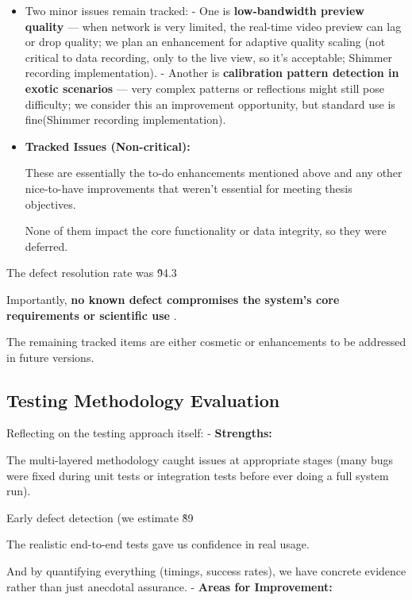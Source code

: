 {{{{{{{{{{{{{{{{\begin{itemize}
\item Two minor issues remain tracked: - One is \textbf{low-bandwidth preview quality}
 --- when network is very limited, the real-time video preview can lag or drop quality; we plan an enhancement for adaptive quality scaling (not critical to data recording, only to the live view, so it's acceptable; Shimmer recording implementation). - Another is \textbf{calibration pattern detection in exotic scenarios}
 --- very complex patterns or reflections might still pose difficulty; we consider this an improvement opportunity, but standard use is fine(Shimmer recording implementation).

\item \textbf{Tracked Issues (Non-critical):}

These are essentially the to-do enhancements mentioned above and any other nice-to-have improvements that weren't essential for meeting thesis objectives.

None of them impact the core functionality or data integrity, so they were deferred.

\end{itemize}

The defect resolution rate was \~94.3%

Importantly, \textbf{no known defect compromises the system's core requirements or scientific use}
.

The remaining tracked items are either cosmetic or enhancements to be addressed in future versions.

\subsection{Testing Methodology Evaluation}

Reflecting on the testing approach itself: - \textbf{Strengths:}

The multi-layered methodology caught issues at appropriate stages (many bugs were fixed during unit tests or integration tests before ever doing a full system run).

Early defect detection (we estimate \~89%

The realistic end-to-end tests gave us confidence in real usage.

And by quantifying everything (timings, success rates), we have concrete evidence rather than just anecdotal assurance. - \textbf{Areas for Improvement:}

}}}}}}}}}}}}}}}}
